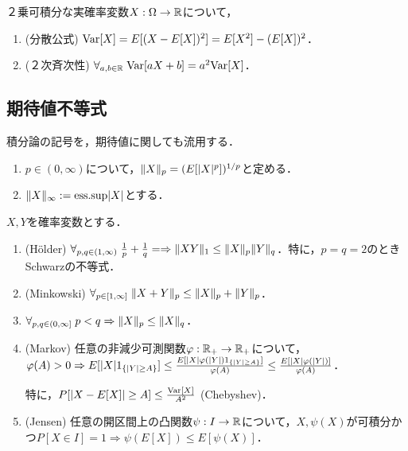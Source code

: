 \documentclass[uplatex,dvipdfmx]{jsreport}
\begin{document}
\begin{proposition}[分散の性質]
    ２乗可積分な実確率変数$X:\Omega\to\mathbb{R}$について，
    \begin{enumerate}
        \item (分散公式) $\mathrm{Var}[X]=E[(X-E[X])^2]=E[X^2]-(E[X])^2$．
        \item (２次斉次性) $\forall_{a,b\in\mathbb{R}}\;\mathrm{Var}[aX+b]=a^2\mathrm{Var}[X]$．
    \end{enumerate}
\end{proposition}

\subsection{期待値不等式}

\begin{notation}
    積分論の記号を，期待値に関しても流用する．
    \begin{enumerate}
        \item $p\in(0,\infty)$について，$\|X\|_p=(E[\lvert X\rvert^p])^{1/p}$と定める．
        \item $\|X\|_\infty:=\mathrm{ess.sup}\lvert X\rvert$とする．
    \end{enumerate}
\end{notation}

\begin{theorem}[測度論における結果]
    $X,Y$を確率変数とする．
    \begin{enumerate}
        \item (Hölder) $\forall_{p,q\in(1,\infty)}\;\frac{1}{p}+\frac{1}{q}=\Rightarrow\|XY\|_1\le\|X\|_p\|Y\|_q$．特に，$p=q=2$のときSchwarzの不等式．
        \item (Minkowski) $\forall_{p\in[1,\infty]}\;\|X+Y\|_p\le\|X\|_p+\|Y\|_p$．
        \item $\forall_{p,q\in(0,\infty]}\;p<q\Rightarrow\|X\|_p\le\|X\|_q$．
        \item (Markov) 任意の非減少可測関数$\varphi:\mathbb{R}_+\to\mathbb{R}_+$について，$\varphi(A)>0\Rightarrow E[\lvert X\rvert1_{\left\{\lvert Y\rvert\ge A\right\}}]\le\frac{E[\lvert X\rvert\varphi(\lvert Y\rvert)1_{\left\{\lvert Y\rvert\ge A\right\}}]}{\varphi(A)}\le\frac{E[\lvert X\rvert\varphi(\lvert Y\rvert)]}{\varphi(A)}$．
        
        特に，$P[\lvert X-E[X]\rvert\ge A]\le\frac{\mathrm{Var}[X]}{A^2}$ (Chebyshev)．
        \item (Jensen) 任意の開区間上の凸関数$\psi:I\to\mathbb{R}$について，$X,\psi(X)$が可積分かつ$P[X\in I]=1\Rightarrow\psi(E[X])\le E[\psi(X)]$．
    \end{enumerate}
\end{theorem}
\end{document}
